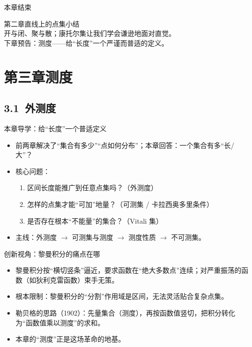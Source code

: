 \documentclass[aspectratio=169,11pt]{ctexbeamer}
\begin{document}
\begin{frame}{本章结束}
  \begin{center}
    {\color{clouddeep}\Large 第二章\quad 直线上的点集\quad 小结}\\[0.4cm]
    {\color{cloudgray}开与闭、聚与散；康托尔集让我们学会谦逊地面对直觉。}\\[0.6cm]
    {\color{cloudblue}下章预告：测度——给“长度”一个严谨而普适的定义。}
  \end{center}
\end{frame}

\section{第三章\quad 测度}

\subsection{3.1\ 外测度}

\begin{frame}{本章导学：给“长度”一个普适定义}
  \begin{itemize}
    \item 前两章解决了“集合有多少”“点如何分布”；本章回答：\alert{一个集合有多“长/大”}？
    \item 核心问题：
      \begin{enumerate}
        \item 区间长度能推广到任意点集吗？（外测度）
        \item 怎样的点集才能“可加”地量？（可测集 / 卡拉西奥多里条件）
        \item 是否存在根本“不能量”的集合？（Vitali 集）
      \end{enumerate}
    \item 主线：\alert{外测度 $\to$ 可测集与测度 $\to$ 测度性质 $\to$ 不可测集}。
  \end{itemize}
\end{frame}

\begin{frame}{创新视角：黎曼积分的痛点在哪}
  \begin{itemize}
    \item 黎曼积分按“横切竖条”逼近，要求函数在“绝大多数点”连续；对严重振荡的函数（如狄利克雷函数）束手无策。
    \item 根本限制：黎曼积分的“分割”作用域是区间，无法灵活贴合复杂点集。
    \item 勒贝格的思路（1902）：\alert{先量集合（测度），再按函数值竖切}，把积分转化为“函数值乘以测度”的求和。
    \item 本章的“测度”正是这场革命的地基。
  \end{itemize}
\end{frame}
\end{document}
